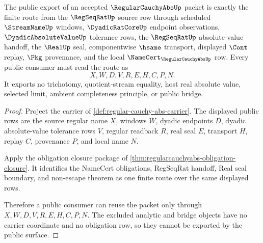 \begin{theorem}
\label{thm:regular-cauchy-abs-public-export-surface}
The public export of an accepted $\RegularCauchyAbsUp$ packet is exactly the finite route from the $\RegSeqRatUp$ source row through scheduled $\StreamNameUp$ windows, $\DyadicRatCoreUp$ endpoint observations, $\DyadicAbsoluteValueUp$ tolerance rows, the $\RegSeqRatUp$ absolute-value handoff, the $\RealUp$ seal, componentwise $\hsame$ transport, displayed $\Cont$ replay, $\Pkg$ provenance, and the local $\NameCert_{\RegularCauchyAbsUp}$ row. Every public consumer must read the route as
$$
X,W,D,V,R,E,H,C,P,N .
$$
It exports no trichotomy, quotient-stream equality, host real absolute value, selected limit, ambient completeness principle, or public bridge.
\end{theorem}
\begin{proof}
Project the carrier of \autoref{def:regular-cauchy-abs-carrier}. The displayed public rows are the source regular name $X$, windows $W$, dyadic endpoints $D$, dyadic absolute-value tolerance rows $V$, regular readback $R$, real seal $E$, transport $H$, replay $C$, provenance $P$, and local name $N$.

Apply the obligation closure package of \autoref{thm:regularcauchyabs-obligation-closure}. It identifies the NameCert obligations, RegSeqRat handoff, Real seal boundary, and non-escape theorem as one finite route over the same displayed rows.

Therefore a public consumer can reuse the packet only through $X,W,D,V,R,E,H,C,P,N$. The excluded analytic and bridge objects have no carrier coordinate and no obligation row, so they cannot be exported by the public surface.
\end{proof}

